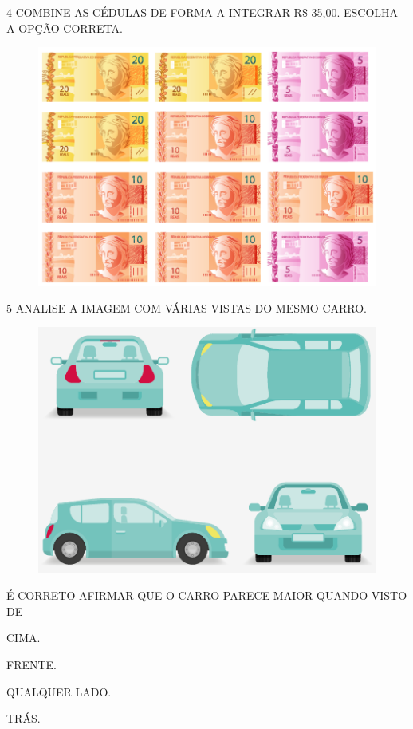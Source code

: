 \pagebreak
\num{4} COMBINE AS CÉDULAS DE FORMA A INTEGRAR R\$ 35,00. ESCOLHA A OPÇÃO CORRETA.

\begin{figure}[htpb!]
\includegraphics[width=.6\textwidth]{./media/SAEB_1ANO_MAT_FIGURA129.png}
\end{figure}

\num{5} ANALISE A IMAGEM COM VÁRIAS VISTAS DO MESMO CARRO.


\begin{figure}[htpb!]
\centering
\includegraphics[width=.5\textwidth]{./media/SAEB_1ANO_MAT_FIGURA130.png}
\end{figure}

É CORRETO AFIRMAR QUE O CARRO PARECE MAIOR QUANDO VISTO DE

\begin{escolha}[itemsep=0pt]
\item CIMA.

\item FRENTE.

\item QUALQUER LADO.

\item TRÁS.
\end{escolha}

